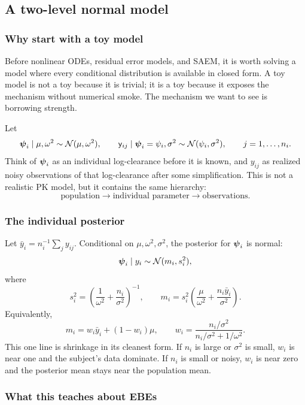 \subsection{A two-level normal model}

\subsubsection*{Why start with a toy model}

Before nonlinear ODEs, residual error models, and SAEM, it is worth solving a model where every conditional distribution is available in closed form.  A toy model is not a toy because it is trivial; it is a toy because it exposes the mechanism without numerical smoke.  The mechanism we want to see is borrowing strength.

Let
\[
  \boldsymbol{\psi}_i\mid \mu,\omega^2 \sim \mathcal{N}(\mu,\omega^2),
  \qquad
  \mathsf{y}_{ij}\mid \boldsymbol{\psi}_i=\psi_i,\sigma^2\sim\mathcal{N}(\psi_i,\sigma^2),
  \qquad
  j=1,\ldots,n_i.
\]
Think of \(\boldsymbol{\psi}_i\) as an individual log-clearance before it is known, and \(y_{ij}\) as realized noisy observations of that log-clearance after some simplification.  This is not a realistic PK model, but it contains the same hierarchy:
\[
  \text{population} \longrightarrow \text{individual parameter} \longrightarrow \text{observations}.
\]

\subsubsection*{The individual posterior}

Let \(\bar y_i=n_i^{-1}\sum_j y_{ij}\).  Conditional on \(\mu,\omega^2,\sigma^2\), the posterior for \(\boldsymbol{\psi}_i\) is normal:
\[
  \boldsymbol{\psi}_i\mid y_i
  \sim
  \mathcal{N}(m_i,s_i^2),
\]
where
\[
  s_i^2
  =
  \left(
    \frac{1}{\omega^2}
    +
    \frac{n_i}{\sigma^2}
  \right)^{-1},
  \qquad
  m_i
  =
  s_i^2
  \left(
    \frac{\mu}{\omega^2}
    +
    \frac{n_i\bar y_i}{\sigma^2}
  \right).
\]
Equivalently,
\[
  m_i
  =
  w_i\bar y_i+(1-w_i)\mu,
  \qquad
  w_i=
  \frac{n_i/\sigma^2}{n_i/\sigma^2+1/\omega^2}.
\]
This one line is shrinkage in its cleanest form.  If \(n_i\) is large or \(\sigma^2\) is small, \(w_i\) is near one and the subject's data dominate.  If \(n_i\) is small or noisy, \(w_i\) is near zero and the posterior mean stays near the population mean.

\subsubsection*{What this teaches about EBEs}

